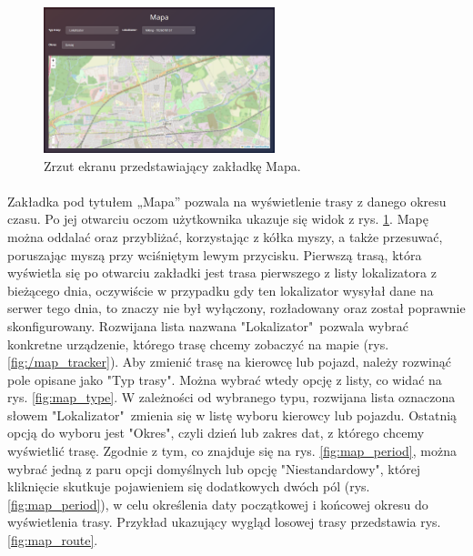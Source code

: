 \begin{figure}
	\centering
	\includegraphics[width=0.6\textwidth]{./graf/map_tab.png}
	\caption{Zrzut ekranu przedstawiający zakładkę Mapa.}
	\label{fig:map_tab}
\end{figure}

\paragraph{}
Zakładka pod tytułem „Mapa” pozwala na wyświetlenie trasy z danego okresu czasu. Po jej otwarciu oczom użytkownika ukazuje się widok z rys. \ref{fig:map_tab}. Mapę można oddalać oraz przybliżać, korzystając z kółka myszy, a także przesuwać, poruszając myszą przy wciśniętym lewym przycisku. Pierwszą trasą, która wyświetla się po otwarciu zakładki jest trasa pierwszego z listy lokalizatora z bieżącego dnia, oczywiście w przypadku gdy ten lokalizator wysyłał dane na serwer tego dnia, to znaczy nie był wyłączony, rozładowany oraz został poprawnie skonfigurowany. Rozwijana lista nazwana "Lokalizator"\ pozwala wybrać konkretne urządzenie, którego trasę chcemy zobaczyć na mapie (rys. \ref{fig:/map_tracker}). Aby zmienić trasę na kierowcę lub pojazd, należy rozwinąć pole opisane jako "Typ trasy". Można wybrać wtedy opcję z listy, co widać na rys. \ref{fig:map_type}. W zależności od wybranego typu, rozwijana lista oznaczona słowem "Lokalizator"\ zmienia się w listę wyboru kierowcy lub pojazdu. Ostatnią opcją do wyboru jest "Okres", czyli dzień lub zakres dat, z którego chcemy wyświetlić trasę. Zgodnie z tym, co znajduje się na rys. \ref{fig:map_period}, można wybrać jedną z paru opcji domyślnych lub opcję "Niestandardowy", której kliknięcie skutkuje pojawieniem się dodatkowych dwóch pól (rys. \ref{fig:map_period}), w celu określenia daty początkowej i końcowej okresu do wyświetlenia trasy. Przykład ukazujący wygląd losowej trasy przedstawia rys. \ref{fig:map_route}.

